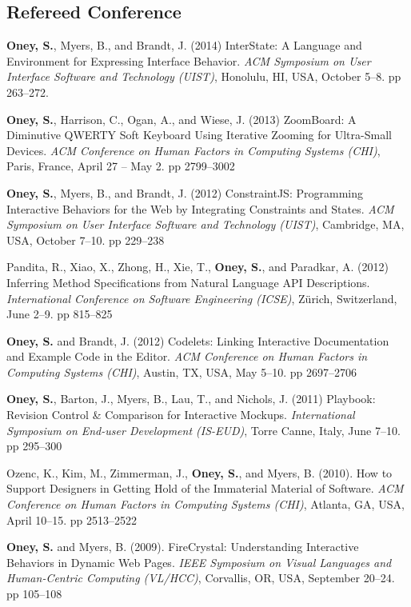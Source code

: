 \subsection{Refereed Conference}

 {
    \textbf{Oney, S.}, Myers, B., and Brandt, J. (2014) InterState: A Language and Environment for Expressing Interface Behavior. \textit{ACM Symposium on User Interface Software and Technology (UIST)}, Honolulu, HI, USA, October 5--8.  pp 263--272.
}

 {
\textbf{Oney, S.}, Harrison, C., Ogan, A., and Wiese, J. (2013) ZoomBoard: A Diminutive QWERTY Soft Keyboard Using Iterative Zooming for Ultra-Small Devices. \textit{ACM Conference on Human Factors in Computing Systems (CHI)}, Paris, France, April 27 -- May 2. pp 2799--3002
}

 {
\textbf{Oney, S.}, Myers, B., and Brandt, J. (2012) ConstraintJS: Programming Interactive Behaviors for the Web by Integrating Constraints and States. \textit{ACM Symposium on User Interface Software and Technology (UIST)}, Cambridge, MA, USA, October 7--10. pp 229--238
}

 {
Pandita, R., Xiao, X., Zhong, H., Xie, T., \textbf{Oney, S.}, and Paradkar, A. (2012) Inferring Method Specifications from Natural Language API Descriptions. \textit{International Conference on Software Engineering (ICSE)}, Z{\"u}rich, Switzerland, June 2--9. pp 815--825
}

 {
\textbf{Oney, S.} and Brandt, J. (2012) Codelets: Linking Interactive Documentation and Example Code in the Editor. \textit{ACM Conference on Human Factors in Computing Systems (CHI)}, Austin, TX, USA, May 5--10. pp 2697--2706
}

 {
\textbf{Oney, S.}, Barton, J., Myers, B., Lau, T., and Nichols, J. (2011) Playbook: Revision Control \& Comparison for Interactive Mockups. \textit{International Symposium on End-user Development (IS-EUD)}, Torre Canne, Italy, June 7--10. pp 295--300
}

 {
Ozenc, K., Kim, M., Zimmerman, J., \textbf{Oney, S.}, and Myers, B. (2010). How to Support Designers in Getting Hold of the Immaterial Material of Software. \textit{ACM Conference on Human Factors in Computing Systems (CHI)}, Atlanta, GA, USA, April 10--15. pp 2513--2522
}

 {
\textbf{Oney, S.} and Myers, B. (2009). FireCrystal: Understanding Interactive Behaviors in Dynamic Web Pages. \textit{IEEE Symposium on Visual Languages and Human-Centric Computing (VL/HCC)}, Corvallis, OR, USA, September 20--24. pp 105--108
}

